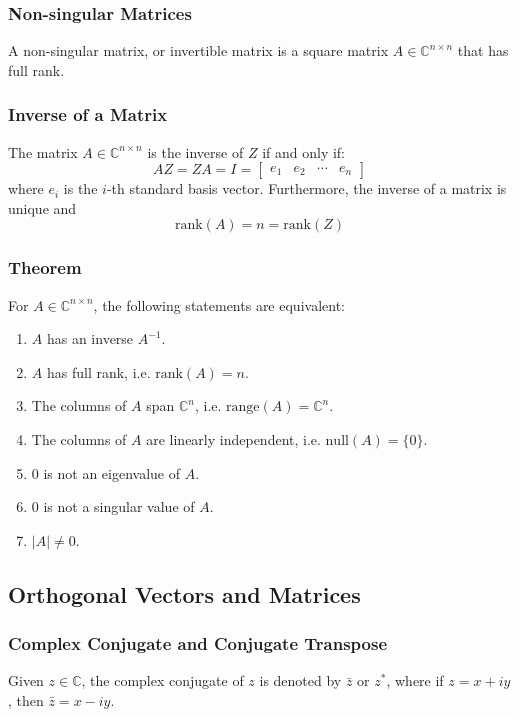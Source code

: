 \documentclass[11pt]{article}
\newcommand{\card}[1]{\lvert #1 \rvert}
\begin{document}
\subsubsection{Non-singular Matrices}
A non-singular matrix, or invertible matrix is a square matrix \( A \in \mathbb{C}^{n \times n} \) that has full rank.

\subsubsection{Inverse of a Matrix}
The matrix \( A \in \mathbb{C}^{n \times n} \) is the inverse of \( Z \) if and only if:
\[AZ = ZA = I = \begin{bmatrix}
    e_1 & e_2 & \cdots & e_n
\end{bmatrix}\]
where \( e_i \) is the \( i \)-th standard basis vector. Furthermore, the inverse of a matrix is unique and
\[\text{rank}(A) = n = \text{rank}(Z)\]

\subsubsection*{Theorem}
For $A \in \mathbb{C}^{n \times n}$, the following statements are equivalent:
\begin{enumerate}
    \item $A$ has an inverse $A^{-1}$.
    \item $A$ has full rank, i.e. $\text{rank}(A) = n$.
    \item The columns of $A$ span $\mathbb{C}^n$, i.e. $\text{range}(A) = \mathbb{C}^n$.
    \item The columns of $A$ are linearly independent, i.e. $\text{null}(A) = \{0\}$.
    \item $0$ is not an eigenvalue of $A$.
    \item $0$ is not a singular value of $A$.
    \item $\card{A} \neq 0$.
\end{enumerate}

\subsection{Orthogonal Vectors and Matrices}
\subsubsection{Complex Conjugate and Conjugate Transpose}
Given $z \in \mathbb{C}$, the complex conjugate of $z$ is denoted by $\bar{z}$ or $z^*$, where if $z = x + iy$, then $\bar{z} = x - iy$.
\end{document}
